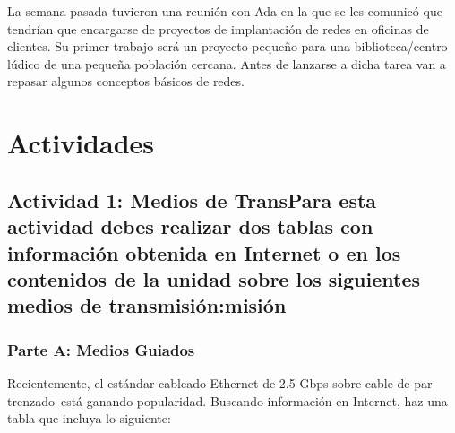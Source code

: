 La semana pasada tuvieron una reunión con Ada en la que se les comunicó que tendrían que encargarse de proyectos de implantación de redes en oficinas de clientes. Su primer trabajo será un proyecto pequeño para una biblioteca/centro lúdico de una pequeña población cercana. Antes de lanzarse a dicha tarea van a repasar algunos conceptos básicos de redes.

\section{Actividades}

\subsection{Actividad 1: Medios de TransPara esta actividad debes realizar dos tablas con información obtenida en Internet o en los contenidos de la unidad sobre los siguientes medios de transmisión:misión}

\subsubsection{Parte A: Medios Guiados}
Recientemente, el estándar cableado Ethernet de 2.5 Gbps sobre cable de par trenzado está ganando popularidad. Buscando información en Internet, haz una tabla que incluya lo siguiente:








\newpage



